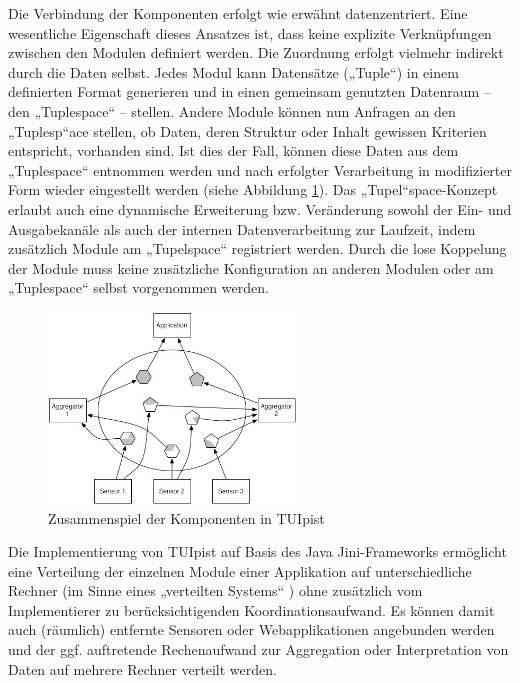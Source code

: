 Die Verbindung der Komponenten erfolgt wie erwähnt datenzentriert. Eine wesentliche Eigenschaft dieses Ansatzes ist, dass keine explizite Verknüpfungen zwischen den Modulen definiert werden. Die Zuordnung erfolgt vielmehr indirekt durch die Daten selbst. Jedes Modul kann Datensätze („Tuple“) in einem definierten Format generieren und in einen gemeinsam genutzten Datenraum -- den „Tuplespace“ -- stellen. Andere Module können nun Anfragen an den „Tuplesp“ace stellen, ob Daten, deren Struktur oder Inhalt gewissen Kriterien entspricht, vorhanden sind. Ist dies der Fall, können diese Daten aus dem „Tuplespace“ entnommen werden und nach erfolgter Verarbeitung in modifizierter Form wieder eingestellt werden (siehe Abbildung \ref{fig:img_ImplementierungInput_TUIpistOperation}). Das „Tupel“space-Konzept erlaubt auch eine dynamische Erweiterung bzw. Veränderung sowohl der Ein- und Ausgabekanäle als auch der internen Datenverarbeitung zur Laufzeit, indem zusätzlich Module am „Tupelspace“ registriert werden. Durch die lose Koppelung der Module muss keine zusätzliche Konfiguration an anderen Modulen oder am „Tuplespace“ selbst vorgenommen werden.

\begin{figure}[htbp]
	\centering
		\includegraphics[height=2in]{img/ImplementierungInput/TUIpistOperation.jpg}
	\caption[Zusammenspiel der Komponenten in TUIpist]{Zusammenspiel der Komponenten in TUIpist \citep{Furtmuller07a}}
	\label{fig:img_ImplementierungInput_TUIpistOperation}
\end{figure}

Die Implementierung von TUIpist auf Basis des Java Jini-Frameworks \citep{Arnold99} ermöglicht eine Verteilung der einzelnen Module einer Applikation auf unterschiedliche Rechner (im Sinne eines „verteilten Systems“ \citep{Stary94}) ohne zusätzlich vom Implementierer zu berücksichtigenden Koordinationsaufwand. Es können damit auch (räumlich) entfernte Sensoren oder Webapplikationen angebunden werden und der ggf. auftretende Rechenaufwand zur Aggregation oder Interpretation von Daten auf mehrere Rechner verteilt werden.

